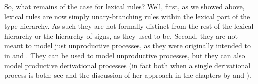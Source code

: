 \documentclass[output=paper
 	        ,biblatex
                ,babelshorthands
                ,newtxmath
                ,draftmode
                ,colorlinks, citecolor=brown
]{langscibook}
\begin{document}
So, what remains of the case for lexical rules? Well, first, as we showed above, lexical rules are now simply unary-branching rules within the lexical part of the type hierarchy. As such they are not formally distinct from the rest of the lexical hierarchy or the hierarchy of signs, as they used to be. Second, they are not meant to model just unproductive processes, as they were originally intended to in \citet{Jackendoff1975} and \citet{Bochner1993}.
They can be used to model unproductive processes, but they can also model productive derivational processes (in fact both when a single derivational process is both; see \citealt{Riehemann98a} and the discussion of her approach in the chapters by  and ).
\end{document}
